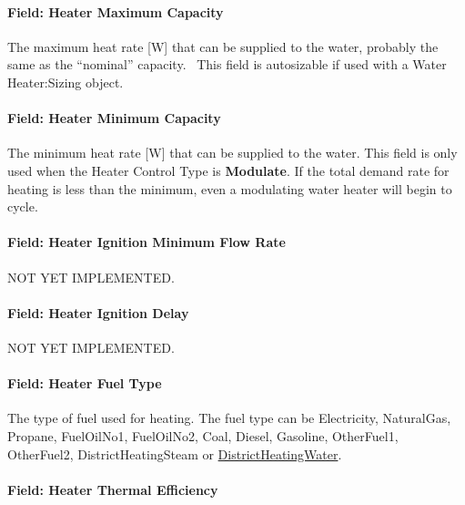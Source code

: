 \paragraph{Field: Heater Maximum Capacity}\label{field-heater-maximum-capacity}

The maximum heat rate {[}W{]} that can be supplied to the water, probably the same as the ``nominal'' capacity.~ This field is autosizable if used with a Water Heater:Sizing object.

\paragraph{Field: Heater Minimum Capacity}\label{field-heater-minimum-capacity}

The minimum heat rate {[}W{]} that can be supplied to the water. This field is only used when the Heater Control Type is \textbf{Modulate}. If the total demand rate for heating is less than the minimum, even a modulating water heater will begin to cycle.

\paragraph{Field: Heater Ignition Minimum Flow Rate}\label{field-heater-ignition-minimum-flow-rate}

NOT YET IMPLEMENTED.

\paragraph{Field: Heater Ignition Delay}\label{field-heater-ignition-delay}

NOT YET IMPLEMENTED.

\paragraph{Field: Heater Fuel Type}\label{field-heater-fuel-type}

The type of fuel used for heating. The fuel type can be Electricity, NaturalGas, Propane, FuelOilNo1, FuelOilNo2, Coal, Diesel, Gasoline, OtherFuel1, OtherFuel2, DistrictHeatingSteam or \hyperref[districtheating]{DistrictHeatingWater}.

\paragraph{Field: Heater Thermal Efficiency}\label{field-heater-thermal-efficiency}

